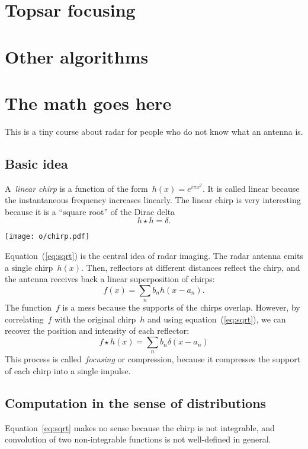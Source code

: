 \documentclass[a4paper]{article}           %
\newcommand{\1}{\mathbf{1}}
\begin{document}
\section{Topsar focusing}

\section{Other algorithms}

\clearpage
\appendix
\section{The math goes here}

This is a tiny course about radar for people who do not know what an antenna
is.

\subsection{Basic idea}
A~\emph{linear chirp} is a function of the form~$h(x)=e^{i\pi x^2}$.  It is
called linear because the instantaneous frequency increases linearly.
The linear chirp is very interesting because it is a ``square root'' of
the Dirac delta
\begin{equation}
	h\star h=\delta.
	\label{eq:sqrt}
\end{equation}

\texttt{[image: o/chirp.pdf]}

Equation~(\ref{eq:sqrt}) is the central idea of radar imaging.  The radar antenna
emits a single chirp~$h(x)$.  Then, reflectors at different distances reflect
the chirp, and the antenna receives back a linear superposition of chirps:
$$
f(x)=\sum_n b_n h(x-a_n).
$$
The function~$f$ is a mess because the supports of the chirps overlap.
However, by correlating~$f$ with the original chirp~$h$ and
using equation~(\ref{eq:sqrt}), we can recover the position and intensity of
each reflector:
$$
f\star h (x) = \sum_n b_n \delta(x - a_n)
$$
This process is called~\emph{focusing} or compression, because it
compresses the support of each chirp into a single impulse.

\subsection{Computation in the sense of distributions}
Equation~\ref{eq:sqrt} makes no sense because the chirp is not integrable,
and convolution of two non-integrable functions is not well-defined
in general.
\end{document}
